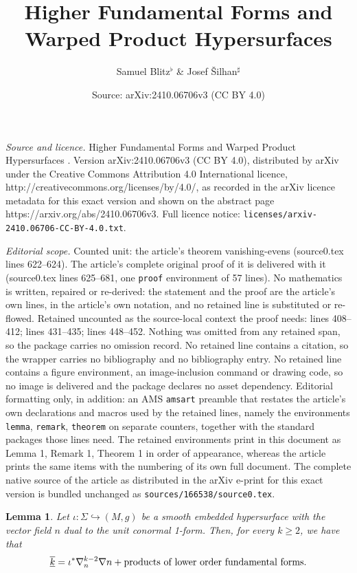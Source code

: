 \documentclass[10pt,a4paper]{amsart}
\title{{Higher Fundamental Forms and Warped Product Hypersurfaces }}
\author{Samuel Blitz${}^\flat$ \& Josef \v{S}ilhan${}^\sharp$}
\date{Source: arXiv:2410.06706v3 (CC BY 4.0)}
\newtheorem{lemma}{Lemma}
\newcommand{\FF}[1]{\underline{\overline{\rm{#1}}}}
\renewcommand\geq{\geqslant}
\begin{document}
\maketitle

\noindent\emph{Source and licence.} {Higher Fundamental Forms and Warped Product Hypersurfaces }. Version arXiv:2410.06706v3 (CC BY 4.0), distributed by arXiv under the Creative Commons Attribution 4.0 International licence, http://creativecommons.org/licenses/by/4.0/, as recorded in the arXiv licence metadata for this exact version and shown on the abstract page https://arxiv.org/abs/2410.06706v3. Full licence notice: \texttt{licenses/arxiv-2410.06706-CC-BY-4.0.txt}.\par\smallskip

\noindent\textit{Editorial scope.} Counted unit: the article's theorem vanishing-evens (source0.tex lines 622--624). The article's complete original proof of it is delivered with it (source0.tex lines 625--681, one \texttt{proof} environment of 57 lines). No mathematics is written, repaired or re-derived: the statement and the proof are the article's own lines, in the article's own notation, and no retained line is substituted or re-flowed.  Retained uncounted as the source-local context the proof needs: lines 408--412; lines 431--435; lines 448--452.  Nothing was omitted from any retained span, so the package carries no omission record.  No retained line contains a citation, so the wrapper carries no bibliography and no bibliography entry.  No retained line contains a figure environment, an image-inclusion command or drawing code, so no image is delivered and the package declares no asset dependency.  Editorial formatting only, in addition: an AMS \texttt{amsart} preamble that restates the article's own declarations and macros used by the retained lines, namely the environments \texttt{lemma}, \texttt{remark}, \texttt{theorem} on separate counters, together with the standard packages those lines need.  The retained environments print in this document as Lemma 1, Remark 1, Theorem 1 in order of appearance, whereas the article prints the same items with the numbering of its own full document.  The complete native source of the article as distributed in the arXiv e-print for this exact version is bundled unchanged as \texttt{sources/166538/source0.tex}.
\begin{lemma} \label{normal-derivs}
Let $\iota : \Sigma \hookrightarrow (M,g)$ be a smooth embedded hypersurface with the vector field $n$ dual to 
the unit conormal 1-form. Then, for every $k \geq 2$, we have that
$$\FF{k} = \iota^* \nabla_n^{k-2} \nabla n + \text{products of lower order fundamental forms.}$$
\end{lemma}
\end{document}
